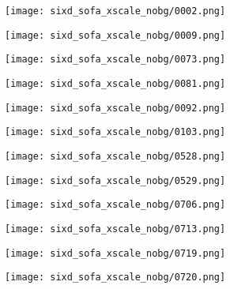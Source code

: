 \begin{figure}[h!]
  \centering
  \begin{subfigure}[b]{0.32\linewidth}
    \texttt{[image: sixd\_sofa\_xscale\_nobg/0002.png]}
  \end{subfigure}
  \begin{subfigure}[b]{0.32\linewidth}
    \texttt{[image: sixd\_sofa\_xscale\_nobg/0009.png]}
  \end{subfigure}
  \begin{subfigure}[b]{0.32\linewidth}
    \texttt{[image: sixd\_sofa\_xscale\_nobg/0073.png]}
  \end{subfigure}
  \begin{subfigure}[b]{0.32\linewidth}
    \texttt{[image: sixd\_sofa\_xscale\_nobg/0081.png]}
  \end{subfigure}
  \begin{subfigure}[b]{0.32\linewidth}
    \texttt{[image: sixd\_sofa\_xscale\_nobg/0092.png]}
  \end{subfigure}
  \begin{subfigure}[b]{0.32\linewidth}
    \texttt{[image: sixd\_sofa\_xscale\_nobg/0103.png]}
  \end{subfigure}
  \begin{subfigure}[b]{0.32\linewidth}
    \texttt{[image: sixd\_sofa\_xscale\_nobg/0528.png]}
  \end{subfigure}
  \begin{subfigure}[b]{0.32\linewidth}
    \texttt{[image: sixd\_sofa\_xscale\_nobg/0529.png]}
  \end{subfigure}
  \begin{subfigure}[b]{0.32\linewidth}
    \texttt{[image: sixd\_sofa\_xscale\_nobg/0706.png]}
  \end{subfigure}
  \begin{subfigure}[b]{0.32\linewidth}
    \texttt{[image: sixd\_sofa\_xscale\_nobg/0713.png]}
  \end{subfigure}
  \begin{subfigure}[b]{0.32\linewidth}
    \texttt{[image: sixd\_sofa\_xscale\_nobg/0719.png]}
  \end{subfigure}
  \begin{subfigure}[b]{0.32\linewidth}
    \texttt{[image: sixd\_sofa\_xscale\_nobg/0720.png]}
  \end{subfigure}
  \begin{subfigure}[b]{0.32\linewidth}

\end{subfigure}
\end{figure}
